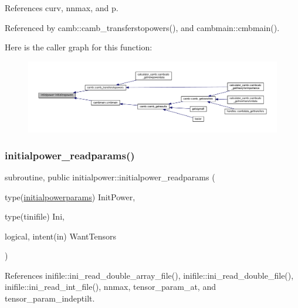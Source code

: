 References curv, nnmax, and p.



Referenced by camb\+::camb\+\_\+transferstopowers(), and cambmain\+::cmbmain().

Here is the caller graph for this function\+:
\nopagebreak
\begin{figure}[H]
\begin{center}
\leavevmode
\includegraphics[width=350pt]{namespaceinitialpower_aa7485ddfdf405ed8912c8070fef8af62_icgraph}
\end{center}
\end{figure}
\mbox{\label{namespaceinitialpower_aad1ed45315709769eb35a28cbc8731f1}} 
\subsubsection{\texorpdfstring{initialpower\+\_\+readparams()}{initialpower\_readparams()}}
{\footnotesize\ttfamily subroutine, public initialpower\+::initialpower\+\_\+readparams (\begin{DoxyParamCaption}\item[{type(\mbox{\hyperlink{structinitialpower_1_1initialpowerparams}{initialpowerparams}})}]{Init\+Power,  }\item[{type(tinifile)}]{Ini,  }\item[{logical, intent(in)}]{Want\+Tensors }\end{DoxyParamCaption})}



References inifile\+::ini\+\_\+read\+\_\+double\+\_\+array\+\_\+file(), inifile\+::ini\+\_\+read\+\_\+double\+\_\+file(), inifile\+::ini\+\_\+read\+\_\+int\+\_\+file(), nnmax, tensor\+\_\+param\+\_\+at, and tensor\+\_\+param\+\_\+indeptilt.

